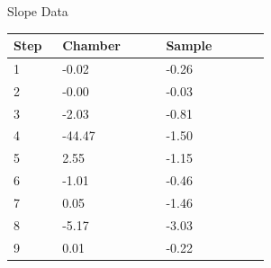 \documentclass[UTF8,10pt,a4paper,fontset=fandol]{ctexart}
\newcommand{\fieldvalue}[1]{#1}
\begin{document}
\noindent
\begin{minipage}[t]{0.36\linewidth}
\centering
Slope Data

\vspace{0.2em}
\begin{tabular}{p{0.16\linewidth}p{0.34\linewidth}p{0.34\linewidth}}
\hline
Step & Chamber & Sample \\
\hline
\fieldvalue{1} &
\fieldvalue{-0.02} &
\fieldvalue{-0.26} \\

\fieldvalue{2} &
\fieldvalue{-0.00} &
\fieldvalue{-0.03} \\

\fieldvalue{3} &
\fieldvalue{-2.03} &
\fieldvalue{-0.81} \\

\fieldvalue{4} &
\fieldvalue{-44.47} &
\fieldvalue{-1.50} \\

\fieldvalue{5} &
\fieldvalue{2.55} &
\fieldvalue{-1.15} \\

\fieldvalue{6} &
\fieldvalue{-1.01} &
\fieldvalue{-0.46} \\

\fieldvalue{7} &
\fieldvalue{0.05} &
\fieldvalue{-1.46} \\

\fieldvalue{8} &
\fieldvalue{-5.17} &
\fieldvalue{-3.03} \\

\fieldvalue{9} &
\fieldvalue{0.01} &
\fieldvalue{-0.22} \\
\hline
\end{tabular}
\end{minipage}
\end{document}
